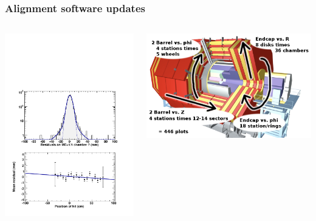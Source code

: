 \documentclass[compress]{beamer}
\begin{document}
\begin{frame}
\frametitle{Alignment software updates}

\begin{columns}
\includegraphics[width=\linewidth]{phizfit_demo_MEp11_7.pdf}

\vspace{0.25 cm}
\includegraphics[width=\linewidth]{CMS_cutaway.png}


\end{columns}
\end{frame}
\end{document}
